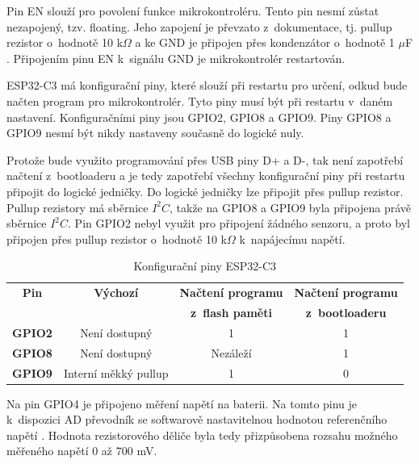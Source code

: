 Pin EN slouží pro povolení funkce mikrokontroléru. Tento pin nesmí zůstat nezapojený, tzv. floating. Jeho zapojení je převzato z~dokumentace, tj. pullup rezistor o~hodnotě 
10 k$\Omega$ a ke GND je připojen přes kondenzátor o~hodnotě 1 $\mu$F \cite{ESP_C3_dtsh}. Připojením pinu EN k~signálu GND je mikrokontrolér restartován. 

ESP32-C3 má konfigurační piny, které slouží při restartu pro určení, odkud bude načten program pro mikrokontrolér. Tyto piny musí být při restartu v~daném nastavení. 
Konfiguračními piny jsou GPIO2, GPIO8 a GPIO9. Piny GPIO8 a GPIO9 nesmí být nikdy nastaveny současně do logické nuly. 

Protože bude využito programování přes USB piny D+ a D-, tak není zapotřebí načtení z~bootloaderu a je tedy zapotřebí všechny konfigurační piny při restartu připojit do 
logické jedničky. Do logické jedničky lze připojit přes pullup rezistor. Pullup rezistory má sběrnice $I^2C$, takže na GPIO8 a GPIO9 byla připojena právě sběrnice $I^2C$.
Pin GPIO2 nebyl využit pro připojení žádného senzoru, a proto byl připojen přes pullup rezistor o~hodnotě 10 k$\Omega$ k~napájecímu napětí.

\begin{table}[!h]
  \caption[Konfigurační piny ESP32-C3]{Konfigurační piny ESP32-C3 \cite{ESP_C3_dtsh}}
  \begin{center}
  	\small
	  \begin{tabular}{|c|c|c|c|}
	    \hline
	    \textbf{Pin}	& \textbf{Výchozí}	& \textbf{Načtení programu} & \textbf{Načtení programu} \\
      \textbf{}	& \textbf{}	& \textbf{z~flash paměti} & \textbf{z~bootloaderu} \\
	    \hline
	    \textbf{GPIO2}	& Není dostupný & 1 & 1 \\ 
	    \hline
	    \textbf{GPIO8}	& Není dostupný & Nezáleží & 1 \\ 
	    \hline
	    \textbf{GPIO9} & Interní měkký pullup & 1 & 0 \\
	    \hline
	  \end{tabular}
  \end{center}
\end{table}

Na pin GPIO4 je připojeno měření napětí na baterii. Na tomto pinu je k~dispozici AD převodník se softwarově nastavitelnou hodnotou referenčního napětí \cite{ESP_C3_tech_ref}. 
Hodnota rezistorového děliče byla tedy přizpůsobena rozsahu možného měřeného napětí 0 až 700 mV. 

